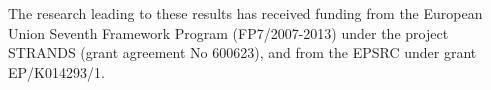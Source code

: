 \documentclass[11pt,letterpaper]{article}
\begin{document}
\begin{acknowledgements} 
\noindent
The research leading to these results has received funding from the European Union Seventh Framework Program (FP7/2007-2013) under the project STRANDS (grant agreement No 600623), and from the EPSRC under grant EP/K014293/1.
\end{acknowledgements} 




\vspace{-0.25in}

{\parindent -10pt\leftskip 10pt\noindent
\footnotesize



}

\end{document}
